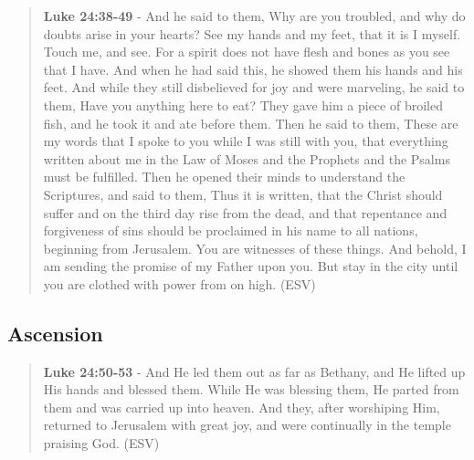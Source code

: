 \documentclass[11pt]{article}
\begin{document}
\begin{quote}
\textbf{Luke 24:38-49} - And he said to them, Why are you troubled, and why do doubts arise in your hearts? See my hands and my feet, that it is I myself. Touch me, and see. For a spirit does not have flesh and bones as you see that I have. And when he had said this, he showed them his hands and his feet. And while they still disbelieved for joy and were marveling, he said to them, Have you anything here to eat? They gave him a piece of broiled fish, and he took it and ate before them. Then he said to them, These are my words that I spoke to you while I was still with you, that everything written about me in the Law of Moses and the Prophets and the Psalms must be fulfilled. Then he opened their minds to understand the Scriptures, and said to them, Thus it is written, that the Christ should suffer and on the third day rise from the dead, and that repentance and forgiveness of sins should be proclaimed in his name to all nations, beginning from Jerusalem. You are witnesses of these things. And behold, I am sending the promise of my Father upon you. But stay in the city until you are clothed with power from on high. (ESV)
\end{quote}

\subsection{Ascension}
\label{sec:orga5821d8}
\begin{quote}
\textbf{Luke 24:50-53} - And He led them out as far as Bethany, and He lifted up His hands and blessed them. While He was blessing them, He parted from them and was carried up into heaven. And they, after worshiping Him, returned to Jerusalem with great joy, and were continually in the temple praising God. (ESV)
\end{quote}
\end{document}
